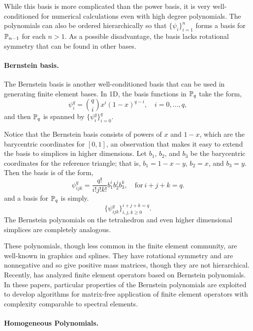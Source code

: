 While this basis is more complicated than the power basis, it is very
well-conditioned for numerical calculations even with high degree
polynomials.  The polynomials can also be ordered hierarchically so
that
\( \{ \psi_i \}_{i=1}^{n} \) forms a basis for $\P_{n-1}$ 
for each \( n > 1 \).  As a possible disadvantage, the
basis lacks rotational symmetry that can be found in  other bases.

\paragraph{Bernstein basis.}
The Bernstein basis is another well-conditioned basis that can be
used in generating finite element bases.
In 1D, the  basis functions in $\P_q$ take the form,
\begin{equation}
\psi_i^q = \binom{q}{i} x^i (1-x)^{q-i}, \quad i=0,\ldots,q,
\end{equation}
and then \( \P_q \) is spanned by \( \{ \psi_i^q \}_{i=0}^q \).

Notice that the Bernstein basis consists of powers of \( x \) and \( 1-x \),  which are the
barycentric coordinates for \( [0,1] \), an observation that makes it
easy to extend the basis to simplices in higher dimensions.
Let $b_1$, $b_2$, and $b_3$ be the barycentric coordinates for
the reference triangle; that is,
$b_1=1-x-y$, $b_2=x$, and $b_3=y$. Then the basis is
of the form,
\begin{equation}
\psi_{ijk}^q = \frac{q!}{i!j!k!} b_1^i b_2^j b_3^k, \quad  \mbox{for} \ i+j+k=q .
\end{equation}
and a basis for $\P_q$ is simply.
\begin{equation}
\{ \psi_{ijk}^q \}_{i,j,k\geq 0}^{i+j+k = q} .
\end{equation}
The Bernstein polynomials on the tetrahedron and even higher
dimensional simplices are completely analogous.

These polynomials, though less common in the finite element community,
are well-known in graphics and splines.  They have 
rotational symmetry and are nonnegative and so give positive
mass matrices, though they are not hierarchical.
Recently, \citet{Kirby2009,Kirby2010} has analyzed finite element operators based on Bernstein
polynomials.  In these papers, particular properties of the Bernstein
polynomials are exploited to develop algorithms for matrix-free
application of finite element operators with complexity comparable to
spectral elements.


\paragraph{Homogeneous Polynomials.}
\label{sec:homo:pol}

